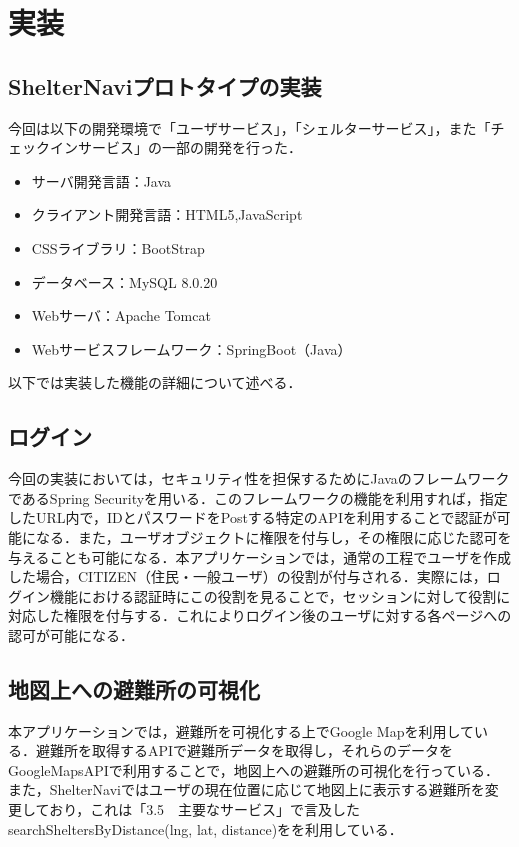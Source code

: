 \documentclass[technicalreport,dvipdfmx]{ieicej}
\begin{document}
\section{実装}
\subsection{ShelterNaviプロトタイプの実装}
今回は以下の開発環境で「ユーザサービス」，「シェルターサービス」，また「チェックインサービス」の一部の開発を行った．
\begin{itemize}
    \item サーバ開発言語：Java
    \item クライアント開発言語：HTML5,JavaScript
    \item CSSライブラリ：BootStrap
    \item データベース：MySQL 8.0.20
    \item Webサーバ：Apache Tomcat
    \item Webサービスフレームワーク：SpringBoot（Java）
\end{itemize}
以下では実装した機能の詳細について述べる．

\subsection{ログイン}
今回の実装においては，セキュリティ性を担保するためにJavaのフレームワークであるSpring Securityを用いる．このフレームワークの機能を利用すれば，指定したURL内で，IDとパスワードをPostする特定のAPIを利用することで認証が可能になる．また，ユーザオブジェクトに権限を付与し，その権限に応じた認可を与えることも可能になる．本アプリケーションでは，通常の工程でユーザを作成した場合，CITIZEN（住民・一般ユーザ）の役割が付与される．実際には，ログイン機能における認証時にこの役割を見ることで，セッションに対して役割に対応した権限を付与する．これによりログイン後のユーザに対する各ページへの認可が可能になる．


\subsection{地図上への避難所の可視化}
本アプリケーションでは，避難所を可視化する上でGoogle Mapを利用している．避難所を取得するAPIで避難所データを取得し，それらのデータをGoogleMapsAPIで利用することで，地図上への避難所の可視化を行っている．また，ShelterNaviではユーザの現在位置に応じて地図上に表示する避難所を変更しており，これは「3.5　主要なサービス」で言及したsearchSheltersByDistance(lng, lat, distance)をを利用している．
\end{document}
